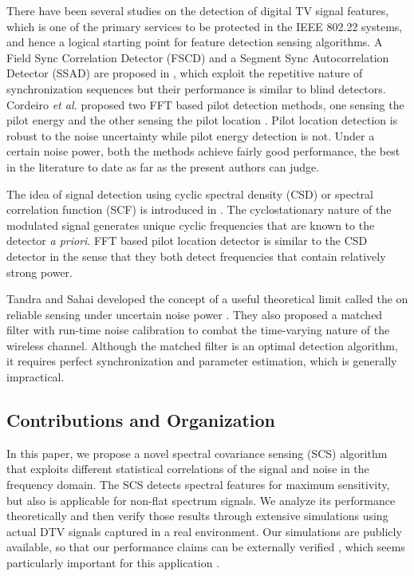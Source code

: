 \documentclass[draftclsnofoot,onecolumn,12pt]{IEEEtran}
\begin{document}
There have been several studies on the detection of digital TV signal features, which is one of the primary services to be protected in the IEEE 802.22 systems, and hence a logical starting point for feature detection sensing algorithms. A Field Sync Correlation Detector (FSCD) and a Segment Sync Autocorrelation Detector (SSAD) are proposed in \cite{CheGao07}, which exploit the repetitive nature of synchronization sequences  but their performance is similar to blind detectors. Cordeiro {\it et al.} proposed two FFT based pilot detection methods, one sensing the pilot energy and the other sensing the pilot location \cite{CorGho07}. Pilot location detection is robust to the noise uncertainty while pilot energy detection is not. Under a certain noise power, both the methods achieve fairly good performance, the best in the literature to date as far as the present authors can judge.

The idea of signal detection using cyclic spectral density (CSD) or spectral correlation function (SCF) is introduced in \cite{HanSho06}. The cyclostationary nature of the modulated signal generates unique cyclic frequencies that are known to the detector {\em a priori}. FFT based pilot location detector \cite{CorGho07} is similar to the CSD detector in the sense that they both detect frequencies that contain relatively strong power. 

Tandra and Sahai developed the concept of a useful theoretical limit called the  on reliable sensing under uncertain noise power \cite{TanSah07, Tandra:thesis}. They also proposed a matched filter with run-time noise calibration \cite{TanSah08} to combat the time-varying nature of the wireless channel. Although the matched filter is an optimal detection algorithm, it requires perfect synchronization and parameter estimation, which is generally impractical.

\subsection{Contributions and Organization}

In this paper, we propose a novel spectral covariance sensing (SCS) algorithm that exploits different statistical correlations of the signal and noise in the frequency domain.  The SCS detects spectral features for maximum sensitivity, but also is applicable for non-flat spectrum signals. We analyze its performance theoretically and then verify those results through extensive simulations using actual DTV signals captured in a real environment.  Our simulations are publicly available, so that our performance claims can be externally verified \cite{SCS-CODE-URL}, which seems particularly important for this application \cite{VanVet09}.
\end{document}
